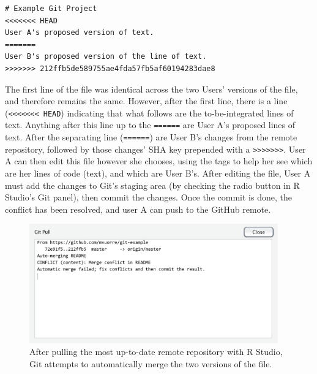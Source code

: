 \documentclass[
  american,
  ,doc,floatsintext]{apa6}
\begin{document}
\begin{verbatim}
# Example Git Project
<<<<<<< HEAD
User A's proposed version of text.
=======
User B's proposed version of the line of text.
>>>>>>> 212ffb5de589755ae4fda57fb5af60194283dae8
\end{verbatim}

The first line of the file was identical across the two Users' versions of the file, and therefore remains the same. However, after the first line, there is a line (\texttt{\textless{}\textless{}\textless{}\textless{}\textless{}\textless{}\textless{}\ HEAD}) indicating that what follows are the to-be-integrated lines of text. Anything after this line up to the \texttt{======} are User A's proposed lines of text. After the separating line (\texttt{======}) are User B's changes from the remote repository, followed by those changes' SHA key prepended with a \texttt{\textgreater{}\textgreater{}\textgreater{}\textgreater{}\textgreater{}\textgreater{}\textgreater{}}. User A can then edit this file however she chooses, using the tags to help her see which are her lines of code (text), and which are User B's. After editing the file, User A must add the changes to Git's staging area (by checking the radio button in R Studio's Git panel), then commit the changes. Once the commit is done, the conflict has been resolved, and user A can push to the GitHub remote.

\begin{figure}

{\centering \includegraphics[width=4.23in]{images/rstudio-git-pull-merge} 

}

\caption{After pulling the most up-to-date remote repository with R Studio, Git attempts to automatically merge the two versions of the file.}\label{fig:rstudio-git-pull-merge}
\end{figure}
\end{document}
